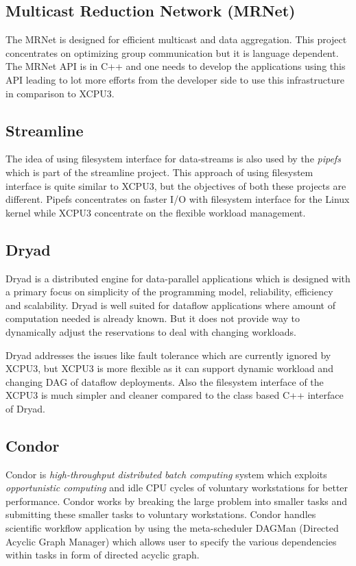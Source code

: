 \documentclass[conference]{IEEEtran}
\begin{document}
\subsection{Multicast Reduction Network (MRNet)}
The MRNet\cite{MRNet} is designed for efficient multicast and data aggregation.
This project concentrates on optimizing group communication but it is language
dependent.  The MRNet API is in C++ and one needs to develop the applications
using this API leading to lot more efforts from the developer side to use this
infrastructure in comparison to XCPU3.

\subsection{Streamline}
The idea of using filesystem interface for data-streams is also used by the
\textit{pipefs}\cite{1400104} which is part of the streamline\cite{streamline}
project.  This approach of using filesystem interface is quite similar to
XCPU3, but the objectives of both these projects are different. Pipefs
concentrates on faster I/O with filesystem interface for the Linux kernel
while XCPU3 concentrate on the flexible workload management.


\subsection{Dryad}
Dryad\cite{yu2008dsg} is a distributed engine for data-parallel applications
which is designed with a primary focus on simplicity of the programming model,
reliability, efficiency and scalability.  Dryad is well suited for dataflow
applications where amount of computation needed is already known.  But it does
not provide way to dynamically adjust the reservations to deal with changing
workloads.    

Dryad addresses the issues like fault tolerance which are currently ignored by
XCPU3, but XCPU3 is more flexible as it can support dynamic workload and
changing DAG of dataflow deployments. Also the filesystem interface of the XCPU3
is much simpler and cleaner compared to the class based C++ interface of Dryad.

\subsection{Condor}
Condor\cite{condor-practice} is \textit{high-throughput distributed batch
computing} system which exploits \textit{opportunistic computing} and idle CPU
cycles of voluntary workstations for better performance.  Condor works by
breaking the large problem into smaller tasks and submitting these smaller
tasks to voluntary workstations. Condor handles scientific workflow
application by using the meta-scheduler DAGMan (Directed Acyclic Graph Manager)
which allows user to specify the various dependencies within tasks in form of
directed acyclic graph. 
\end{document}
